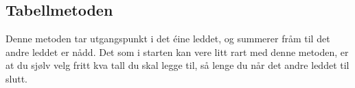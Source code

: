 \subsection{Tabellmetoden}
Denne metoden tar utgangspunkt i det éine leddet, og summerer fråm til det andre leddet er nådd. Det som i starten kan vere litt rart med denne metoden, er at du sjølv velg fritt kva tall du skal legge til, så lenge du når det andre leddet til slutt.
\begin{center}
	\parbox{0.3\linewidth}{
	} \qquad
	\parbox{0.3\linewidth}{
	}
\end{center}
\newpage
